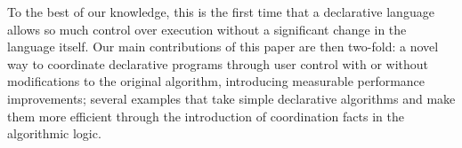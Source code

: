 To the best of our knowledge, this is the first time that a declarative language allows so much
control over execution without a significant change in the language itself.
Our main contributions of this paper are then two-fold: a novel way to coordinate
declarative programs through user control with or without modifications to the
original algorithm, introducing measurable performance improvements; several
examples that take simple declarative algorithms and make them more
efficient through the introduction of coordination facts in the algorithmic
logic.
